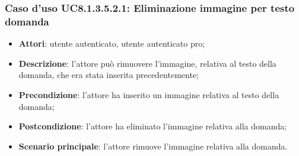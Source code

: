 \subsubsection{Caso d'uso UC8.1.3.5.2.1: Eliminazione immagine per testo domanda}
\begin{itemize}
	\item\textbf{Attori}: utente autenticato, utente autenticato pro;
	\item\textbf{Descrizione}: l'attore può rimuovere l'immagine, relativa al testo della domanda, che era stata inserita precedentemente;
	\item\textbf{Precondizione}: l'attore ha inserito un immagine relativa al testo della domanda;
	\item \textbf{Postcondizione}: l'attore ha eliminato l'immagine relativa alla domanda;
	\item\textbf{Scenario principale}: l'attore rimuove l'immagine relativa alla domanda. 
\end{itemize}

